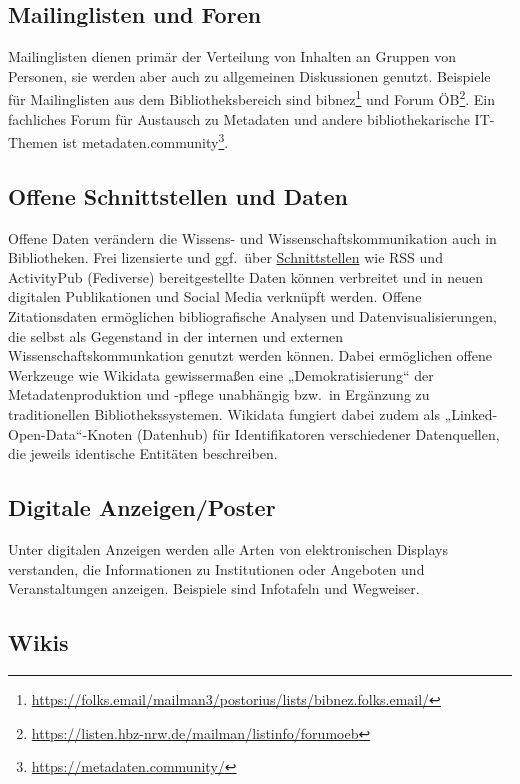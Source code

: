 \documentclass[
  11pt,
  letterpaper,
  DIV=11,
  twoside]{scrreprt}
\DeclareRobustCommand{\href}[2]{#2\footnote{\url{#1}}}
\begin{document}
\subsection{Mailinglisten und Foren}\label{mailinglisten-und-foren}

Mailinglisten dienen primär der Verteilung von Inhalten an Gruppen von
Personen, sie werden aber auch zu allgemeinen Diskussionen genutzt.
Beispiele für Mailinglisten aus dem Bibliotheksbereich sind
\href{https://folks.email/mailman3/postorius/lists/bibnez.folks.email/}{bibnez}
und \href{https://listen.hbz-nrw.de/mailman/listinfo/forumoeb}{Forum
ÖB}. Ein fachliches Forum für Austausch zu Metadaten und andere
bibliothekarische IT-Themen ist
\href{https://metadaten.community/}{metadaten.community}.

\subsection{Offene Schnittstellen und
Daten}\label{offene-schnittstellen-und-daten}

Offene Daten verändern die Wissens- und Wissenschaftskommunikation auch
in Bibliotheken. Frei lizensierte und ggf.~über
\hyperref[schnittstellen]{Schnittstellen} wie {RSS} und ActivityPub
(Fediverse) bereitgestellte Daten können verbreitet und in neuen
digitalen Publikationen und Social Media verknüpft werden. Offene
Zitationsdaten ermöglichen bibliografische Analysen und
Datenvisualisierungen, die selbst als Gegenstand in der internen und
externen Wissenschaftskommunkation genutzt werden können. Dabei
ermöglichen offene Werkzeuge wie Wikidata gewissermaßen eine
„Demokratisierung`` der Metadatenproduktion und -pflege unabhängig
bzw.~in Ergänzung zu traditionellen Bibliothekssystemen. Wikidata
fungiert dabei zudem als „Linked-Open-Data``-Knoten (Datenhub) für
Identifikatoren verschiedener Datenquellen, die jeweils identische
Entitäten beschreiben.

\subsection{Digitale Anzeigen/Poster}\label{digitale-anzeigenposter}

Unter digitalen Anzeigen werden alle Arten von elektronischen Displays
verstanden, die Informationen zu Institutionen oder Angeboten und
Veranstaltungen anzeigen. Beispiele sind Infotafeln und Wegweiser.

\subsection{Wikis}\label{wikis}
\end{document}
